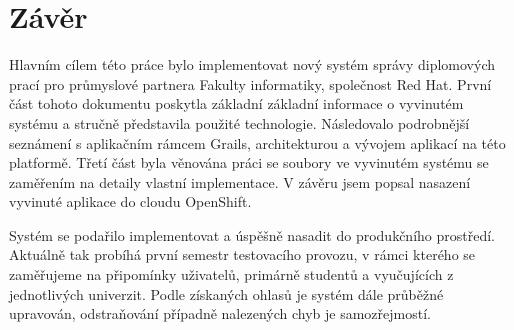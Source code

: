 \chapter{Závěr}
Hlavním cílem této práce bylo implementovat nový systém správy diplomových prací pro průmyslové partnera Fakulty informatiky, společnost Red Hat. První část tohoto dokumentu poskytla základní základní informace o vyvinutém systému a stručně představila použité technologie. Následovalo podrobnější seznámení s aplikačním rámcem Grails, architekturou a vývojem aplikací na této platformě. Třetí část byla věnována práci se soubory ve vyvinutém systému se zaměřením na detaily vlastní implementace. V závěru jsem popsal nasazení vyvinuté aplikace do cloudu OpenShift.

Systém se podařilo implementovat a úspěšně nasadit do produkčního prostředí. Aktuálně tak probíhá první semestr testovacího provozu, v rámci kterého se zaměřujeme na připomínky uživatelů, primárně studentů a vyučujících z jednotlivých univerzit. Podle získaných ohlasů je systém dále průběžné upravován, odstraňování případně nalezených chyb je samozřejmostí.
